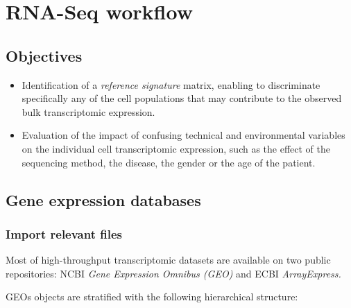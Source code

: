 \chapter{RNA-Seq workflow}
\label{chap:transcriptome-workflow}



\section{Objectives} 

\begin{itemize}
\item
  Identification of a \emph{reference signature} matrix, enabling to discriminate specifically any of the cell populations that may contribute to the observed bulk transcriptomic expression.
\item
  Evaluation of the impact of confusing technical and environmental variables on the individual cell transcriptomic expression, such as the effect of the sequencing method, the disease, the gender or the age of the patient.
\end{itemize}


\section{Gene expression databases} 
\label{gene-expression-databases}


\subsection{Import relevant files} 
\label{import-relevant-files}

Most of high-throughput transcriptomic datasets are available on two public repositories: NCBI \emph{Gene Expression Omnibus (GEO)} and ECBI \emph{ArrayExpress.}

GEOs objects are stratified with the following hierarchical structure:

